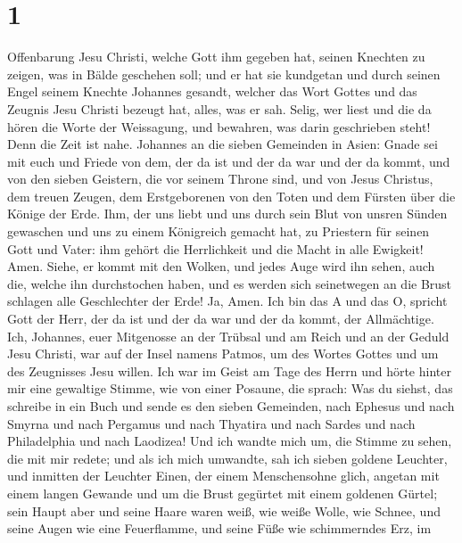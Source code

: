 \hypertarget{section}{%
\section{1}\label{section}}

 Offenbarung Jesu Christi, welche Gott ihm gegeben hat,
seinen Knechten zu zeigen, was in Bälde geschehen soll; und er hat sie
kundgetan und durch seinen Engel seinem Knechte Johannes gesandt,
 welcher das Wort Gottes und das Zeugnis Jesu Christi
bezeugt hat, alles, was er sah.  Selig, wer liest und die
da hören die Worte der Weissagung, und bewahren, was darin geschrieben
steht! Denn die Zeit ist nahe.  Johannes an die sieben
Gemeinden in Asien: Gnade sei mit euch und Friede von dem, der da ist
und der da war und der da kommt, und von den sieben Geistern, die vor
seinem Throne sind,  und von Jesus Christus, dem treuen
Zeugen, dem Erstgeborenen von den Toten und dem Fürsten über die Könige
der Erde.  Ihm, der uns liebt und uns durch sein Blut von
unsren Sünden gewaschen und uns zu einem Königreich gemacht hat, zu
Priestern für seinen Gott und Vater: ihm gehört die Herrlichkeit und die
Macht in alle Ewigkeit! Amen.  Siehe, er kommt mit den
Wolken, und jedes Auge wird ihn sehen, auch die, welche ihn durchstochen
haben, und es werden sich seinetwegen an die Brust schlagen alle
Geschlechter der Erde! Ja, Amen.  Ich bin das A und das O,
spricht Gott der Herr, der da ist und der da war und der da kommt, der
Allmächtige.  Ich, Johannes, euer Mitgenosse an der
Trübsal und am Reich und an der Geduld Jesu Christi, war auf der Insel
namens Patmos, um des Wortes Gottes und um des Zeugnisses Jesu willen.
 Ich war im Geist am Tage des Herrn und hörte hinter mir
eine gewaltige Stimme, wie von einer Posaune, die sprach:
 Was du siehst, das schreibe in ein Buch und sende es den
sieben Gemeinden, nach Ephesus und nach Smyrna und nach Pergamus und
nach Thyatira und nach Sardes und nach Philadelphia und nach Laodizea!
 Und ich wandte mich um, die Stimme zu sehen, die mit mir
redete; und als ich mich umwandte, sah ich sieben goldene Leuchter,
 und inmitten der Leuchter Einen, der einem Menschensohne
glich, angetan mit einem langen Gewande und um die Brust gegürtet mit
einem goldenen Gürtel;  sein Haupt aber und seine Haare
waren weiß, wie weiße Wolle, wie Schnee, und seine Augen wie eine
Feuerflamme,  und seine Füße wie schimmerndes Erz, im
